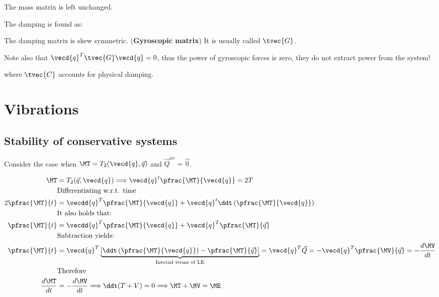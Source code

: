 \documentclass[10pt,a4paper]{scrartcl}
\begin{document}
\begin{multicols*}{2}
\vspace{3ex}

The mass matrix is left unchanged.


The damping is found as:


The damping matrix is skew symmetric. (\textbf{Gyroscopic matrix}) It is usually called $\tvec{G}$.


Note also that $\vecd{q}^T\tvec{G}\vecd{q}=0$, thus the power of gyroscopic forces is zero, they do not extract power from the system!


where $\tvec{C}$ accounts for physical damping.

\section{Vibrations}

\subsection{Stability of conservative systems}

Consider the case when $\MT = T_2(\vecd{q},\vec{q})$ and $\vec{Q}^{nc}=\vec{0}$.

\begin{align*}
\MT&=T_2(\vec{q},\vecd{q})\Longrightarrow \vecd{q}^t\pfrac{\MT}{\vecd{q}}=2T\\
&\text{Differentiating w.r.t. time}\\
2\pfrac{\MT}{t}&=\vecdd{q}^T\pfrac{\MT}{\vecd{q}}+\vecd{q}^t\ddt\left(\pfrac{\MT}{\vecd{q}}\right)\\
&\text{It also holds that:}\\
\pfrac{\MT}{t}&=\vecdd{q}^T\pfrac{\MT}{\vecd{q}}+\vecd{q}^T\pfrac{\MT}{\vec{q}}\\
&\text{Subtraction yields:}\\
\pfrac{\MT}{t}&=\vecd{q}^T\underbrace{\left[\ddt\left(\pfrac{\MT}{\vecd{q}}\right)-\pfrac{\MT}{\vec{q}}\right]}_{\text{Inertial terms of LE}}=\vecd{q}^T\vec{Q}=-\vecd{q}^T\pfrac{\MV}{\vec{q}}=-\frac{d\MV}{dt}\\
&\text{Therefore}\\
\frac{d\MT}{dt}&=-\frac{d\MV}{dt}\Longrightarrow\ddt(T+V)=0\Longrightarrow \MT+\MV=\ME
\end{align*}


\end{multicols*}
\end{document}
